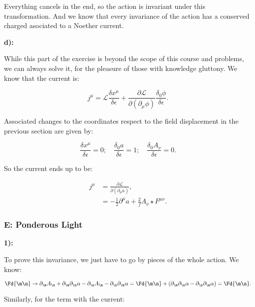 Everything cancels in the end, so the action is invariant under this transformation. And we know that every invariance of the action has a conserved charged asociated to a Noether current.


\textbf{d):}

While this part of the exercise is beyond the scope of this course and problems, we can always solve it, for the pleasure of those with knowledge gluttony. We know that the current is:

\begin{equation}
	j^{\mu}=\mathcal{L} \frac{\delta x^{\mu}}{\delta \epsilon}+\frac{\partial \mathcal{L}}{\partial\left(\partial_{\mu} \phi\right)} \frac{\delta_{0} \phi}{\delta \epsilon}.
\end{equation}

Associated changes to the coordinates respect to the field displacement in the previous section are given by:

\begin{equation}
	\frac{\delta x^{\mu}}{\delta \epsilon}=0 ; \quad \frac{\delta_{0} a}{\delta \epsilon}=1 ; \quad \frac{\delta_{0} A_{\nu}}{\delta \epsilon}=0.
\end{equation}

So the current ends up to be:

\begin{equation}
	\begin{split}
		j^{\mu}&=\frac{\partial \mathcal{L}}{\partial\left(\partial_{\mu} a\right)},\\
		&= -\frac{1}{2} \partial^{\mu} a+\frac{2}{f} A_{\nu} \star F^{\mu \nu}.
	\end{split}
\end{equation}

\subsubsection{E: Ponderous Light}\label{E: Ponderous Light}

\textbf{1):}

To prove this invariance, we just have to go by pieces of the whole action. We know:

\begin{equation}
	\Fd{\m\n} \rightarrow \pd{\m}\vad{\n} + \pd{\m}\pd{\n} \alpha - \pd{\n}\vad{\m} - \pd{\n}\pd{\m} \alpha = \Fd{\m\n} + ( \pd{\m}\pd{\n} \alpha-  \pd{\n}\pd{\m} \alpha) = \Fd{\m\n}. 
\end{equation}

Similarly, for the term with the current:

